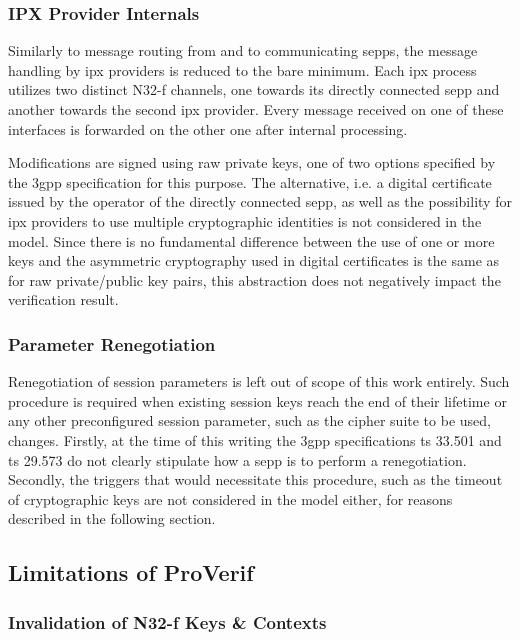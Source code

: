 \subsubsection{IPX Provider Internals}

Similarly to message routing from and to communicating \glspl{sepp}, the message handling by \gls{ipx} providers is reduced to the bare minimum.
Each \gls{ipx} process utilizes two distinct N32-f channels, one towards its directly connected \gls{sepp} and another towards the second \gls{ipx} provider.
Every message received on one of these interfaces is forwarded on the other one after internal processing.

Modifications are signed using raw private keys, one of two options specified by the \gls{3gpp} specification for this purpose.
The alternative, i.e. a digital certificate issued by the operator of the directly connected \gls{sepp}, as well as the possibility for \gls{ipx} providers to use multiple cryptographic identities is not considered in the model.
Since there is no fundamental difference between the use of one or more keys and the asymmetric cryptography used in digital certificates is the same as for raw private/public key pairs, this abstraction does not negatively impact the verification result.

\subsubsection{Parameter Renegotiation}

Renegotiation of session parameters is left out of scope of this work entirely.
Such procedure is required when existing session keys reach the end of their lifetime or any other preconfigured session parameter, such as the cipher suite to be used, changes.
Firstly, at the time of this writing the \gls{3gpp} specifications \gls{ts} 33.501 and \gls{ts} 29.573 do not clearly stipulate how a \gls{sepp} is to perform a renegotiation.
Secondly, the triggers that would necessitate this procedure, such as the timeout of cryptographic keys are not considered in the model either, for reasons described in the following section.

\subsection{Limitations of ProVerif}

\subsubsection{Invalidation of N32-f Keys \& Contexts}

